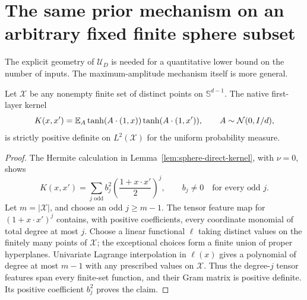 \section{The same prior mechanism on an arbitrary fixed finite sphere subset}
\label{sec:arbitrary-finite-domain}
The explicit geometry of $\mathcal U_D$ is needed for a quantitative lower bound on the number of inputs. The maximum-amplitude mechanism itself is more general.

\begin{lemma}
\label{lem:finite-kernel-positive}
Let $\mathcal X$ be any nonempty finite set of distinct points on $\mathbb S^{d-1}$. The native first-layer kernel
\[
 K(x,x')=\mathbb E_A\tanh(A\cdot(1,x))\tanh(A\cdot(1,x')),
 \qquad A\sim\mathcal N(0,I/d),
\]
is strictly positive definite on $L^2(\mathcal X)$ for the uniform probability measure.
\end{lemma}
\begin{proof}
The Hermite calculation in Lemma~\ref{lem:sphere-direct-kernel}, with $\nu=0$, shows
\[
 K(x,x')=\sum_{j\text{ odd}}b_j^2
            \left(\frac{1+x\cdot x'}2\right)^j,
 \qquad b_j\ne0\quad\text{for every odd }j.
\]
Let $m=|\mathcal X|$, and choose an odd $j\ge m-1$. The tensor feature map for $(1+x\cdot x')^j$ contains, with positive coefficients, every coordinate monomial of total degree at most $j$. Choose a linear functional $\ell$ taking distinct values on the finitely many points of $\mathcal X$; the exceptional choices form a finite union of proper hyperplanes. Univariate Lagrange interpolation in $\ell(x)$ gives a polynomial of degree at most $m-1$ with any prescribed values on $\mathcal X$. Thus the degree-$j$ tensor features span every finite-set function, and their Gram matrix is positive definite. Its positive coefficient $b_j^2$ proves the claim.
\end{proof}

